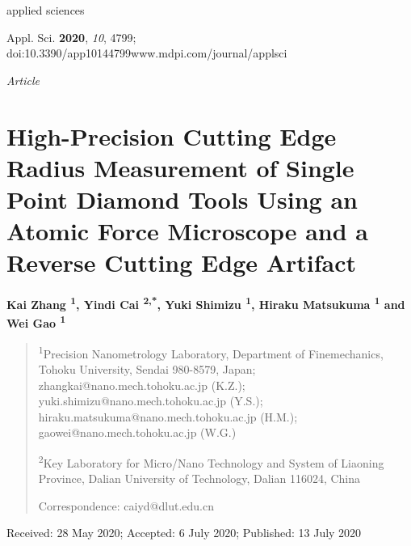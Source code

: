 \documentclass{article}
\begin{document}

\noindent applied sciences\par
\noindent Appl. Sci. \textbf{2020}, \emph{10}, 4799; doi:10.3390/app10144799\quad www.mdpi.com/journal/applsci\par
\medskip
\noindent\emph{Article}

\section*{High-Precision Cutting Edge Radius Measurement of Single Point Diamond Tools Using an Atomic Force Microscope and a Reverse Cutting Edge Artifact}

\noindent\textbf{Kai Zhang \textsuperscript{1}, Yindi Cai \textsuperscript{2,*}, Yuki Shimizu \textsuperscript{1}, Hiraku Matsukuma \textsuperscript{1} and Wei Gao \textsuperscript{1}}

\begin{quote}\small
\noindent \textsuperscript{1}\quad Precision Nanometrology Laboratory, Department of Finemechanics, Tohoku University, Sendai 980-8579, Japan; zhangkai@nano.mech.tohoku.ac.jp (K.Z.); yuki.shimizu@nano.mech.tohoku.ac.jp (Y.S.); hiraku.matsukuma@nano.mech.tohoku.ac.jp (H.M.); gaowei@nano.mech.tohoku.ac.jp (W.G.)

\noindent \textsuperscript{2}\quad Key Laboratory for Micro/Nano Technology and System of Liaoning Province, Dalian University of Technology, Dalian 116024, China

\noindent *\quad Correspondence: caiyd@dlut.edu.cn
\end{quote}

\noindent Received: 28 May 2020; Accepted: 6 July 2020; Published: 13 July 2020
\end{document}
